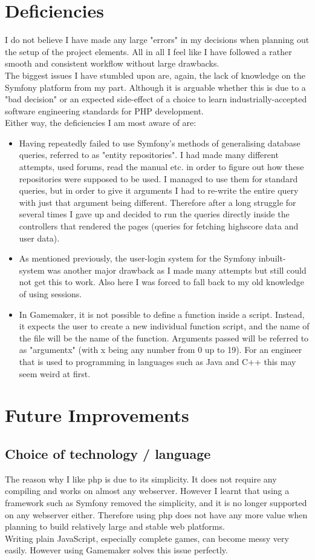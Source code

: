 \documentclass[12pt]{report}
\begin{document}
\section*{Deficiencies}
I do not believe I have made any large "errors" in my decisions when planning out the setup of the project elements. All in all I feel like I have followed a rather smooth and consistent workflow without large drawbacks.\\
The biggest issues I have stumbled upon are, again, the lack of knowledge on the Symfony platform from my part. Although it is arguable whether this is due to a "bad decision" or an expected side-effect of a choice to learn industrially-accepted software engineering standards for PHP development.\\
Either way, the deficiencies I am most aware of are:
\begin{itemize}
\item Having repeatedly failed to use Symfony's methods of generalising database queries, referred to as "entity repositories". I had made many different attempts, used forums, read the manual etc. in order to figure out how these repositories were supposed to be used. I managed to use them for standard queries, but in order to give it arguments I had to re-write the entire query with just that argument being different. Therefore after a long struggle for several times I gave up and decided to run the queries directly inside the controllers that rendered the pages (queries for fetching highscore data and user data).
\item As mentioned previously, the user-login system for the Symfony inbuilt-system was another major drawback as I made many attempts but still could not get this to work. Also here I was forced to fall back to my old knowledge of using sessions.
\item In Gamemaker, it is not possible to define a function inside a script. Instead, it expects the user to create a new individual function script, and the name of the file will be the name of the function. Arguments passed will be referred to as "argumentx" (with x being any number from 0 up to 19). For an engineer that is used to programming in languages such as Java and C++ this may seem weird at first.
\end{itemize}

\section*{Future Improvements}
\subsection*{Choice of technology / language}
The reason why I like php is due to its simplicity. It does not require any compiling and works on almost any webserver. However I learnt that using a framework such as Symfony removed the simplicity, and it is no longer supported on any webserver either. Therefore using php does not have any more value when planning to build relatively large and stable web platforms.\\
Writing plain JavaScript, especially complete games, can become messy very easily. However using Gamemaker solves this issue perfectly.
\end{document}
